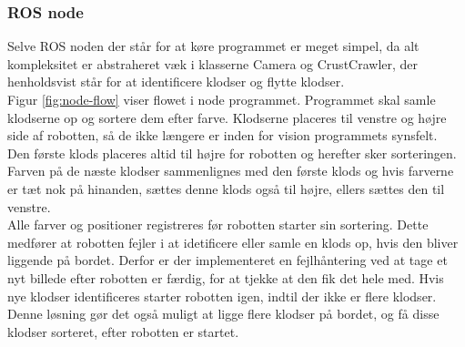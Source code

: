 \subsubsection{ROS node}
Selve ROS noden der står for at køre programmet er meget simpel, da alt kompleksitet er abstraheret væk i klasserne Camera og CrustCrawler, der henholdsvist står for at identificere klodser og flytte klodser. \\

Figur \ref{fig:node-flow} viser flowet i node programmet. Programmet skal samle klodserne op og sortere dem efter farve. Klodserne placeres til venstre og højre side af robotten, så de ikke længere er inden for vision programmets synsfelt. \\

Den første klods placeres altid til højre for robotten og herefter sker sorteringen. Farven på de næste klodser sammenlignes med den første klods og hvis farverne er tæt nok på hinanden, sættes denne klods også til højre, ellers sættes den til venstre. \\

Alle farver og positioner registreres før robotten starter sin sortering.
Dette medfører at robotten fejler i at idetificere eller samle en klods op, hvis den bliver liggende på bordet. Derfor er der implementeret en fejlhåntering ved at tage et nyt billede efter robotten er færdig, for at tjekke at den fik det hele med. Hvis nye klodser identificeres starter robotten igen, indtil der ikke er flere klodser. Denne løsning gør det også muligt at ligge flere klodser på bordet, og få disse klodser sorteret, efter robotten er startet.


